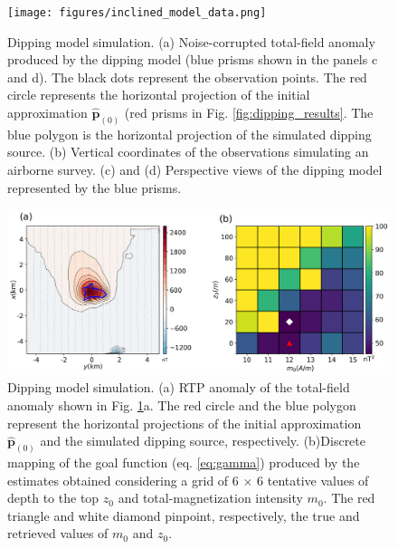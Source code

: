 
\begin{figure}
    \centering
    \texttt{[image: figures/inclined\_model\_data.png]}
    \caption{Dipping model simulation. (a) Noise-corrupted total-field anomaly produced by the dipping model (blue prisms shown in the panels c and d). The black dots represent the observation points. The red circle represents the horizontal projection 
   	of the initial approximation $\hat{\mathbf{p}}_{(0)}$ 
   	(red prisms in Fig. \ref{fig:dipping_results}. The blue polygon is the horizontal projection of the simulated dipping source.
   	(b) Vertical coordinates of the observations simulating an airborne survey. (c) and (d) Perspective views of the dipping model represented by the blue prisms.
}
    \label{fig:dipping_model}
\end{figure}

\begin{figure}
    \centering
    \includegraphics[width=\linewidth]{figures/inclined_rtp.png}
    \caption{Dipping model simulation. (a) RTP anomaly of the total-field anomaly shown in 
	Fig. \ref{fig:dipping_model}a. 
	The red circle and the blue polygon represent the horizontal projections of the 	   initial approximation $\hat{\mathbf{p}}_{(0)}$ and  the simulated dipping source, respectively.
	(b)Discrete mapping of the goal function (eq. \ref{eq:gamma}) produced by the estimates   	       obtained considering a grid of 6 $\times$ 6 tentative values of 
	   depth to the top $z_0$ and total-magnetization intensity $m_0$. 
	   The red triangle  and white diamond pinpoint, respectively, the true and retrieved 	   
	   values of $m_0$  and $z_0$.     
}
    \label{fig:dipping_rtp}
\end{figure}


